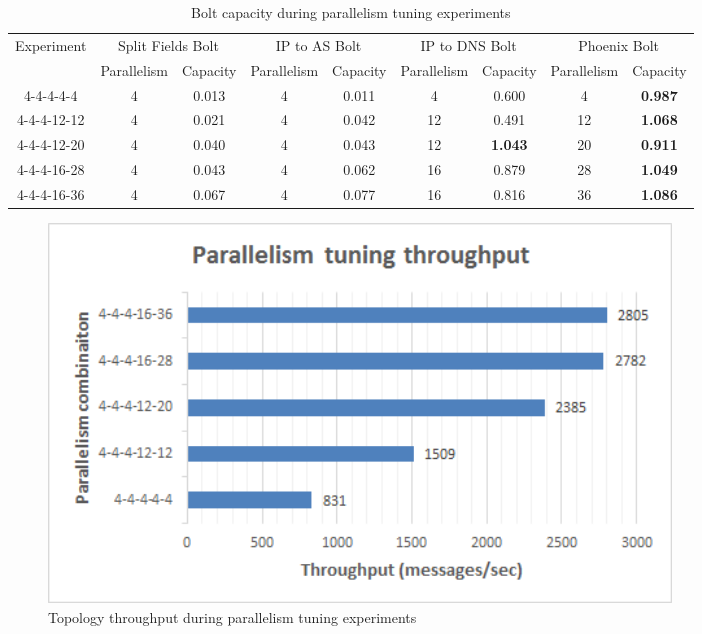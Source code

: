 \begin{table}[h!]
\centering
\resizebox{1\textwidth}{!} {
\begin{tabular}{ |*{9}{c|} }
\hline
\multirow{2}{*}{Experiment} & \multicolumn{2}{|c|}{Split Fields Bolt} & \multicolumn{2}{|c|}{IP to AS Bolt} & \multicolumn{2}{|c|}{IP to DNS Bolt} & \multicolumn{2}{|c|}{Phoenix Bolt} \\ \cline{2-9}
 & Parallelism & Capacity & Parallelism & Capacity & Parallelism & Capacity & Parallelism & Capacity \\ \hline \hline
4-4-4-4-4 & 4 & 0.013 & 4 & 0.011 & 4 & 0.600 & 4 & \textbf{0.987} \\ \hline
4-4-4-12-12 & 4 & 0.021 & 4 & 0.042 & 12 & 0.491 & 12 & \textbf{1.068} \\ \hline
4-4-4-12-20 & 4 & 0.040 & 4 & 0.043 & 12 & \textbf{1.043} & 20 & \textbf{0.911} \\ \hline
4-4-4-16-28 & 4 & 0.043 & 4 & 0.062 & 16 & 0.879 & 28 & \textbf{1.049} \\ \hline
4-4-4-16-36 & 4 & 0.067 & 4 & 0.077 & 16 & 0.816 & 36 & \textbf{1.086} \\ \hline
\end{tabular}
}
\caption{Bolt capacity during parallelism tuning experiments}
\label{table:parallelism_tuning}
\end{table}

\begin{figure}[h!]
\centering
\includegraphics[width=0.8\textwidth]{figures/benchmarks_storm_tuning_throughput}
\caption{Topology throughput during parallelism tuning experiments}
\label{figure:benchmarks_storm_tuning_throughput}
\end{figure}

